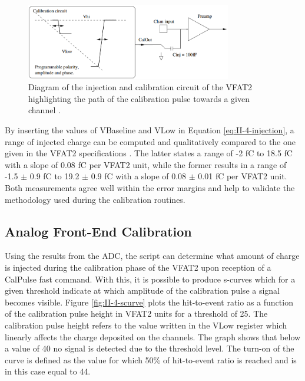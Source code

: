       \begin{figure}[h!]
        \centering
        \includegraphics[width=0.8\textwidth]{img/II-4-qualification/injection.png}
        \caption{Diagram of the injection and calibration circuit of the VFAT2 highlighting the path of the calibration pulse towards a given channel \cite{Aspell:1267947}.}
        \label{fig:II-4-injection}
      \end{figure}

      By inserting the values of VBaseline and VLow in Equation \ref{eq:II-4-injection}, a range of injected charge can be computed and qualitatively compared to the one given in the VFAT2 specifications \cite{Aspell:1267947}. The latter states a range of -2 fC to 18.5 fC with a slope of 0.08 fC per VFAT2 unit, while the former results in a range of -1.5 $\pm$ 0.9 fC to 19.2 $\pm$ 0.9 fC with a slope of 0.08 $\pm$ 0.01 fC per VFAT2 unit. Both measurements agree well within the error margins and help to validate the methodology used during the calibration routines.

    \subsection{Analog Front-End Calibration}

      Using the results from the ADC, the script can determine what amount of charge is injected during the calibration phase of the VFAT2 upon reception of a CalPulse fast command. With this, it is possible to produce s-curves which for a given threshold indicate at which amplitude of the calibration pulse a signal becomes visible. Figure \ref{fig:II-4-scurve} plots the hit-to-event ratio as a function of the calibration pulse height in VFAT2 units for a threshold of 25. The calibration pulse height refers to the value written in the VLow register which linearly affects the charge deposited on the channels. The graph shows that below a value of 40 no signal is detected due to the threshold level. The turn-on of the curve is defined as the value for which 50\% of hit-to-event ratio is reached and is in this case equal to 44. \\

